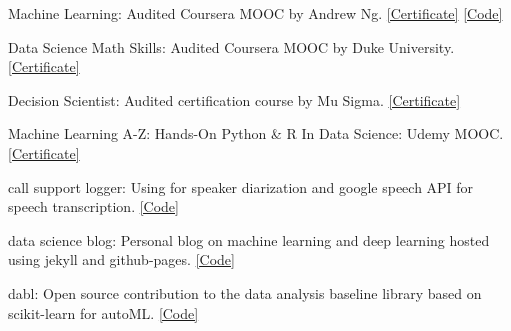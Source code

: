 \documentclass[10pt,a4paper]{article}
\begin{document}
\spacedhrule{1.6em}{-0.4em}



\inlineheadsection
  {Machine Learning:}
  {Audited Coursera MOOC by Andrew Ng. \href{https://www.coursera.org/account/accomplishments/certificate/6UDGCV3A6A7L?utm_medium=certificate&utm_source=link&utm_campaign=copybutton_certificate}{[Certificate]}
\href{https://github.com/praths007/coursera_machine_learning}{[Code]}}

\vspace{0.6em}

\inlineheadsection
{Data Science Math Skills:}
{Audited Coursera MOOC by Duke University. \href{https://www.coursera.org/account/accomplishments/certificate/S3BXH5HH2BLH}{[Certificate]}
}

\vspace{0.6em}


\inlineheadsection
  {Decision Scientist:}
  {Audited certification course by Mu Sigma. \href{https://www.portal.mu-sigma.com/msu/DecisionScientistCertificate/8388-Jun2017-10390.html}{[Certificate]}}

\vspace{0.6em}

\inlineheadsection
  {Machine Learning A-Z: Hands-On Python \& R In Data Science:}
  {Udemy MOOC. \href{https://www.udemy.com/certificate/UC-PXVDG31R/}{[Certificate]}}

\spacedhrule{1.6em}{-0.4em}



\inlineheadsection
{call support logger:}
{Using  for speaker diarization and google speech API for speech transcription. \href{https://github.com/praths007/speechtotext/}{[Code]}}

\vspace{0.6em}

\inlineheadsection
  {data science blog:}
  {Personal blog on machine learning and deep learning hosted using jekyll and github-pages. \href{https://github.com/praths007/praths007.github.io.git}{[Code]}}
  
\vspace{0.6em}
  
 \inlineheadsection
 {dabl:}
 {Open source contribution to the data analysis baseline library based on scikit-learn for autoML. \href{https://github.com/dabl/dabl}{[Code]}}
 
\vspace{0.6em}
\end{document}
